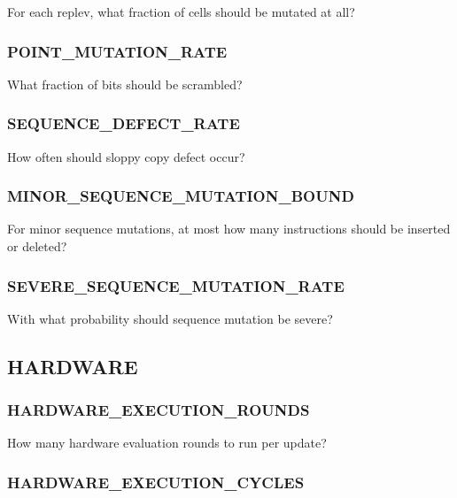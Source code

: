 
For each replev, what fraction of cells should be mutated at all?

\subsubsection{POINT\_MUTATION\_RATE}


What fraction of bits should be scrambled?

\subsubsection{SEQUENCE\_DEFECT\_RATE}


How often should sloppy copy defect occur?

\subsubsection{MINOR\_SEQUENCE\_MUTATION\_BOUND}


For minor sequence mutations, at most how many instructions should be inserted or deleted?

\subsubsection{SEVERE\_SEQUENCE\_MUTATION\_RATE}


With what probability should sequence mutation be severe?

\subsection{HARDWARE}

\subsubsection{HARDWARE\_EXECUTION\_ROUNDS}


How many hardware evaluation rounds to run per update?

\subsubsection{HARDWARE\_EXECUTION\_CYCLES}

